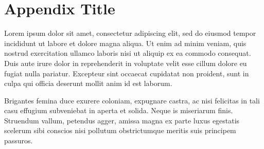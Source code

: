 \chapter{Appendix Title}

Lorem ipsum dolor sit amet, consectetur adipiscing elit, sed do eiusmod tempor incididunt ut labore et dolore magna aliqua. Ut enim ad minim veniam, quis nostrud exercitation ullamco laboris nisi ut aliquip ex ea commodo consequat. Duis aute irure dolor in reprehenderit in voluptate velit esse cillum dolore eu fugiat nulla pariatur. Excepteur sint occaecat cupidatat non proident, sunt in culpa qui officia deserunt mollit anim id est laborum.

Brigantes femina duce exurere coloniam, expugnare castra, ac nisi felicitas in tali casu effugium subveniebat in aperta et solida. Neque is miseriarum finis. Struendum vallum, petendus agger, amissa magna ex parte luxus egestatis scelerum sibi conscios nisi pollutum obstrictumque meritis suis principem passuros.

